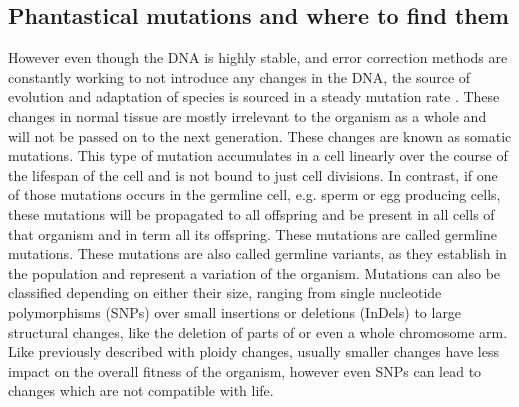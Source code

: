 \subsection[Mutations]{Phantastical mutations and where to find them}
\label{intro-sec:mutations}
However even though the DNA is highly stable, and error correction methods are constantly working to not introduce any changes in the DNA, the source of evolution and adaptation of species is sourced in a steady mutation rate \cite{Darwin2010,Sprouffske2018}. These changes in normal tissue are mostly irrelevant to the organism as a whole and will not be passed on to the next generation. These changes are known as somatic mutations. This type of mutation accumulates in a cell linearly over the course of the lifespan of the cell and is not bound to just cell divisions\cite{Alexandrov2015,Moore2021}. 
In contrast, if one of those mutations occurs in the germline cell, e.g. sperm or egg producing cells, these mutations will be propagated to all offspring and be present in all cells of that organism and in term all its offspring. These mutations are called germline mutations. These mutations are also called germline variants, as they establish in the population and represent a variation of the organism.
Mutations can also be classified depending on either their size, ranging from single nucleotide polymorphisms (SNPs) over small insertions or deletions (InDels) to large structural changes, like the deletion of parts of or even a whole chromosome arm. Like previously described with ploidy changes, usually smaller changes have less impact on the overall fitness of the organism, however even SNPs can lead to changes which are not compatible with life\cite{Shamseldin2015,Frey2021}.

